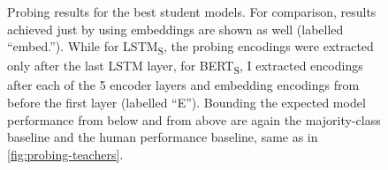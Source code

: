 \documentclass[bsc,frontabs,twoside,singlespacing,parskip,deptreport]{infthesis}
\def\BERTS{BERT\textsubscript{S}}
\def\LSTMS{LSTM\textsubscript{S}}
\begin{document}
{{{      \begin{figure}[h!tb]
        \centering
        \caption{Probing results for the best student models. For comparison, results achieved just by using embeddings are shown as well (labelled ``embed.''). While for \LSTMS, the probing encodings were extracted only after the last LSTM layer, for \BERTS, I extracted encodings after each of the 5 encoder layers and embedding encodings from before the first layer (labelled ``E''). Bounding the expected model performance from below and from above are again the majority-class baseline and the human performance baseline, same as in \autoref{fig:probing-teachers}.}
        \label{fig:probing-students}
      \end{figure}

}}}
\end{document}
